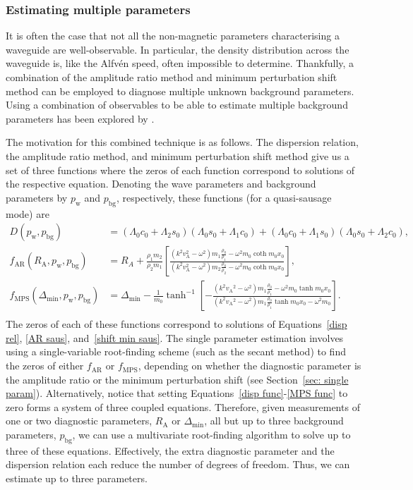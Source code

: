 \documentclass[12pt]{../style-files/ociamthesis}
\begin{document}
\subsubsection{Estimating multiple parameters} \label{sec: multiple params}

It is often the case that not all the non-magnetic parameters characterising a waveguide are well-observable. In particular, the density distribution across the waveguide is, like the Alfv\'{e}n speed, often impossible to determine. Thankfully, a combination of the amplitude ratio method and minimum perturbation shift method can be employed to diagnose multiple unknown background parameters. Using a combination of observables to be able to estimate multiple background parameters has been explored by \cite{arr_etal07,Goo_etal08}.

The motivation for this combined technique is as follows. The dispersion relation, the amplitude ratio method, and minimum perturbation shift method give us a set of three functions where the zeros of each function correspond to solutions of the respective equation. Denoting the wave parameters and background parameters by $p_\mathrm{w}$ and $p_\mathrm{bg}$, respectively, these functions (for a quasi-sausage mode) are
\begin{align}
D(p_\mathrm{w}, p_\mathrm{bg}) &= (\Lambda_0c_0 + \Lambda_2s_0)(\Lambda_0s_0 + \Lambda_1c_0) + (\Lambda_0c_0 + \Lambda_1s_0)(\Lambda_0s_0 + \Lambda_2c_0), \label{disp func} \\
f_{\mathrm{AR}}(R_\mathrm{A}, p_\mathrm{w}, p_\mathrm{bg}) &= R_A + \frac{\rho_1m_2}{\rho_2m_1}\left[\frac{(k^2v_\textrm{A}^2 - \omega^2)m_1\frac{\rho_0}{\rho_1} - \omega^2m_0\coth{m_0x_0}}{(k^2v_\textrm{A}^2 - \omega^2)m_2\frac{\rho_0}{\rho_2} - \omega^2m_0\coth{m_0x_0}}\right], \label{AR func} \\
f_{\mathrm{MPS}}(\Delta_\mathrm{min}, p_\mathrm{w}, p_\mathrm{bg}) &= \Delta_\textrm{min} - \frac{1}{m_0}\tanh^{-1}\left[-\frac{(k^2{v_\textrm{A}}^2 - \omega^2)m_1\frac{\rho_0}{\rho_1} - \omega^2{m_0}\tanh{m_0x_0}}{(k^2{v_\textrm{A}}^2 - \omega^2)m_1\frac{\rho_0}{\rho_1}\tanh{m_0x_0} - \omega^2{m_0}}\right]. \label{MPS func} \\
\end{align}
The zeros of each of these functions correspond to solutions of Equations~\eqref{disp rel}, \eqref{AR saus}, and~\eqref{shift min saus}. The single parameter estimation involves using a single-variable root-finding scheme (such as the secant method) to find the zeros of either $f_\mathrm{AR}$ or $f_\mathrm{MPS}$, depending on whether the diagnostic parameter is the amplitude ratio or the minimum perturbation shift (see Section~\ref{sec: single param}). Alternatively, notice that setting Equations~\eqref{disp func}-\eqref{MPS func} to zero forms a system of three coupled equations. Therefore, given measurements of one or two diagnostic parameters, $R_\mathrm{A}$ or $\Delta_\mathrm{min}$, all but up to three background parameters, $p_\mathrm{bg}$, we can use a multivariate root-finding algorithm to solve up to three of these equations. Effectively, the extra diagnostic parameter and the dispersion relation each reduce the number of degrees of freedom. Thus, we can estimate up to three parameters.
\end{document}
